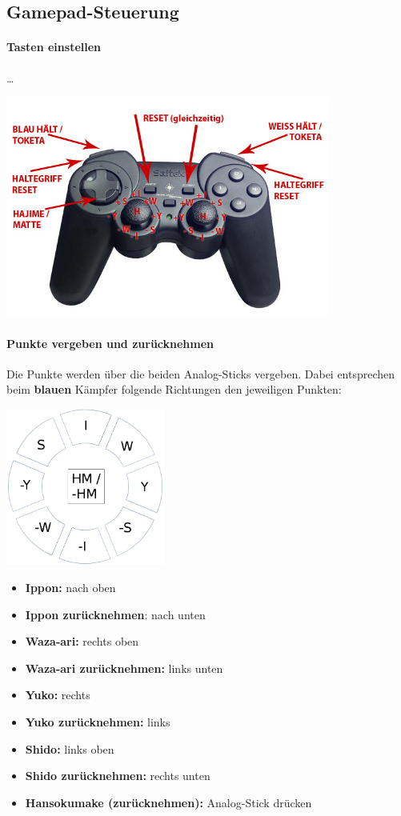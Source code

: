\documentclass[ngerman,12pt,numbers=noenddot]{scrreprt}
\begin{document}
{\subsection{Gamepad-Steuerung}
\paragraph{Tasten einstellen}

\dots

\begin{center}
\includegraphics[width=0.8\textwidth]{Anleitung-img002.jpg}
\end{center}
\paragraph[Punkte vergeben und zur\"ucknehmen]{Punkte vergeben und zur\"ucknehmen}
Die Punkte werden \"uber die beiden Analog-Sticks vergeben. Dabei entsprechen beim \textbf{blauen} K\"ampfer folgende Richtungen den jeweiligen Punkten:
\begin{center}
\includegraphics[width=5.211cm,height=5.17cm]{Anleitung-img003.png}
\end{center}
\begin{itemize}
	\item {\bfseries Ippon:} nach oben
	\item {\bfseries Ippon zur\"ucknehmen}: nach unten
	\item {\bfseries Waza-ari:} rechts oben
	\item {\bfseries Waza-ari zur\"ucknehmen:} links unten
	\item {\bfseries Yuko:} rechts
	\item {\bfseries Yuko zur\"ucknehmen:} links
	\item {\bfseries Shido:} links oben
	\item {\bfseries Shido zur\"ucknehmen:} rechts unten
	\item {\bfseries Hansokumake (zur\"ucknehmen):} Analog-Stick dr\"ucken
\end{itemize}

}
\end{document}
